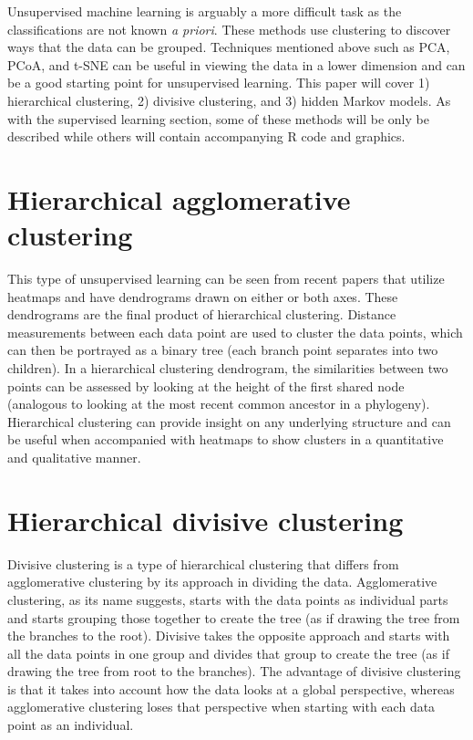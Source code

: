 \documentclass[12pt,openany]{book}
\begin{document}
Unsupervised machine learning is arguably a more difficult task as the
classifications are not known \emph{a priori}. These methods use
clustering to discover ways that the data can be grouped. Techniques
mentioned above such as PCA, PCoA, and t-SNE can be useful in viewing
the data in a lower dimension and can be a good starting point for
unsupervised learning. This paper will cover 1) hierarchical clustering,
2) divisive clustering, and 3) hidden Markov models. As with the
supervised learning section, some of these methods will be only be
described while others will contain accompanying R code and graphics.

\section{Hierarchical agglomerative
clustering}\label{hierarchical-agglomerative-clustering}

This type of unsupervised learning can be seen from recent papers that
utilize heatmaps and have dendrograms drawn on either or both axes.
These dendrograms are the final product of hierarchical clustering.
Distance measurements between each data point are used to cluster the
data points, which can then be portrayed as a binary tree (each branch
point separates into two children). In a hierarchical clustering
dendrogram, the similarities between two points can be assessed by
looking at the height of the first shared node (analogous to looking at
the most recent common ancestor in a phylogeny). Hierarchical clustering
can provide insight on any underlying structure and can be useful when
accompanied with heatmaps to show clusters in a quantitative and
qualitative manner.

\section{Hierarchical divisive
clustering}\label{hierarchical-divisive-clustering}

Divisive clustering is a type of hierarchical clustering that differs
from agglomerative clustering by its approach in dividing the data.
Agglomerative clustering, as its name suggests, starts with the data
points as individual parts and starts grouping those together to create
the tree (as if drawing the tree from the branches to the root).
Divisive takes the opposite approach and starts with all the data points
in one group and divides that group to create the tree (as if drawing
the tree from root to the branches). The advantage of divisive
clustering is that it takes into account how the data looks at a global
perspective, whereas agglomerative clustering loses that perspective
when starting with each data point as an individual.
\end{document}
